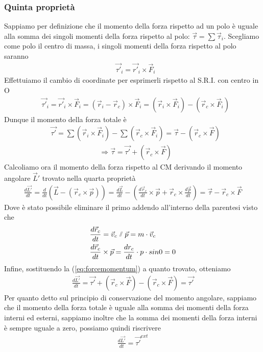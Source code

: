 \subsubsection{Quinta proprietà}
 Sappiamo per definizione che il momento della forza rispetto ad un polo è uguale alla somma dei singoli momenti della forza rispetto al polo: $\vec{\tau}=\sum \vec{\tau}_i$. Scegliamo come polo il centro di massa, i singoli momenti della forza rispetto al polo saranno
 \begin{align*}
 &\vec{\tau'}_i=\vec{r'}_i \times \vec{F}_i
 \end{align*}
Effettuiamo il cambio di coordinate per esprimerli rispetto al S.R.I. con centro in O
\begin{align*}
	&\vec{\tau'}_i=\vec{r'}_i \times \vec{F}_i=(\vec{r}_i-\vec{r}_c)\times \vec{F}_i= (\vec{r}_i \times \vec{F}_i)-(\vec{r}_c \times \vec{F}_i)
\end{align*}
Dunque il momento della forza totale è
 \begin{align*}
 &\vec{\tau'}= \sum (\vec{r}_i \times \vec{F}_i)- \sum(\vec{r}_c \times \vec{F}_i)=\vec{\tau}-(\vec{r}_c\times \vec{F})
\end{align*}
\begin{align} \label{eq:forcemomentum}
&\Rightarrow \vec{\tau}=\vec{\tau '}+(\vec{r}_c\times \vec{F})
\end{align}
Calcoliamo ora il momento della forza rispetto al CM derivando il momento angolare $\vec{L}'$ trovato nella quarta proprietà
\begin{align*}
\frac{d\vec{L'}}{dt}= \frac{d}{dt}(\vec{L}-(\vec{r}_c \times \vec{p}))= \frac{d\vec{L}}{dt}- (\frac{d \vec{r}_c}{dt}\times \vec{p}+ \vec{r}_c\times \frac{d \vec{p}}{dt}) = \vec{\tau} - \vec{r}_c \times \vec{F}
\end{align*}
Dove è stato possibile eliminare il primo addendo all'interno della parentesi visto che 
\begin{align*}
&\frac{d \vec{r}_c}{dt} = \vec{v}_c \newparallel \vec{p}= m \cdot \vec{v}_c\\
&\frac{d \vec{r}_c}{dt}\times \vec{p}=\frac{d r_c}{dt} \cdot p \cdot sin 0 = 0
\end{align*}
Infine, sostituendo la (\ref{eq:forcemomentum}) a quanto trovato, otteniamo
\begin{align*}
\frac{d\vec{L'}}{dt} = \vec{\tau '}+ (\vec{r}_c\times \vec{F}) - (\vec{r}_c\times \vec{F})= \vec{\tau'}
\end{align*}
Per quanto detto sul principio di conservazione del momento angolare, sappiamo che il momento della forza totale è uguale alla somma dei momenti della forza interni ed esterni, sappiamo inoltre che la somma dei momenti della forza interni è sempre uguale a zero, possiamo quindi riscrivere 
\begin{align}\label{eq:cardinale2}
	\frac{d\vec{L'}}{dt} = \vec{\tau'}^{ext}
\end{align}
